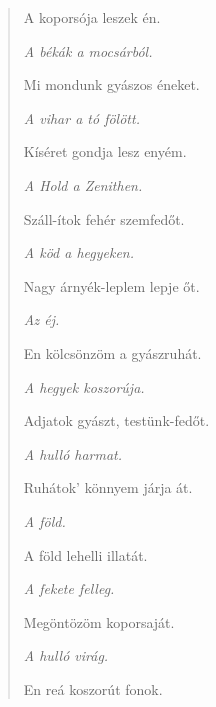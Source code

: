 \begin{verse}
\frqq A koporsója leszek én. \flqq

\smallskip

\textit{A békák a mocsárból.}

\smallskip

\frqq Mi mondunk gyászos éneket. \flqq

\smallskip

\textit{A vihar a tó fölött.}

\smallskip

\frqq Kíséret gondja lesz enyém. \flqq

\smallskip

\textit{A Hold a Zenithen.}

\smallskip

\frqq Száll-ítok fehér szemfedőt. \flqq

\smallskip

\textit{A köd a hegyeken.}

\smallskip

\frqq Nagy árnyék-leplem lepje őt. \flqq

\smallskip

\textit{Az éj.}

\smallskip

\frqq En kölcsönzöm a gyászruhát. \flqq

\smallskip

\textit{A hegyek koszorúja.}

\smallskip

\frqq Adjatok gyászt, testünk-fedőt. \flqq

\smallskip

\textit{A hulló harmat.}

\smallskip

\frqq Ruhátok' könnyem járja át. \flqq

\smallskip

\textit{A föld.}

\smallskip

\frqq A föld lehelli illatát. \flqq

\smallskip

\textit{A fekete felleg.}

\smallskip

\frqq Megöntözöm koporsaját. \flqq

\smallskip

\textit{A hulló virág.}

\smallskip

\frqq En reá koszorút fonok. \flqq

\smallskip


\end{verse}
